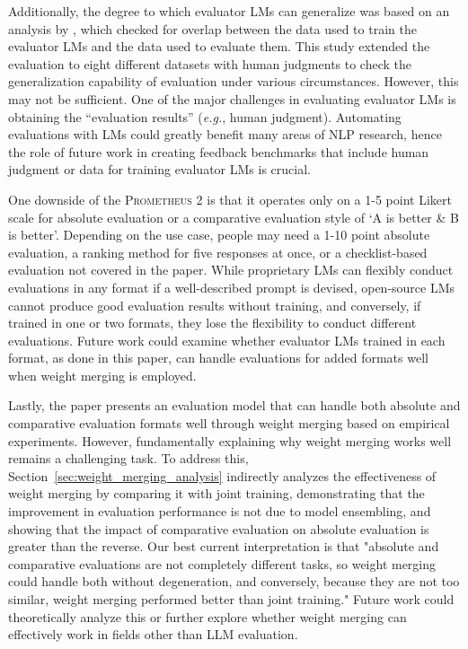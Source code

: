\documentclass[11pt]{article}
\begin{document}
Additionally, the degree to which evaluator LMs can generalize was based on an analysis by \citet{kim2023prometheus}, which checked for overlap between the data used to train the evaluator LMs and the data used to evaluate them. This study extended the evaluation to eight different datasets with human judgments to check the generalization capability of evaluation under various circumstances. However, this may not be sufficient. One of the major challenges in evaluating evaluator LMs is obtaining the ``evaluation results'' (\textit{e.g.}, human judgment). Automating evaluations with LMs could greatly benefit many areas of NLP research, hence the role of future work in creating feedback benchmarks that include human judgment or data for training evaluator LMs is crucial.

One downside of the \textsc{Prometheus 2} is that it operates only on a 1-5 point Likert scale for absolute evaluation or a comparative evaluation style of `A is better \& B is better'. Depending on the use case, people may need a 1-10 point absolute evaluation, a ranking method for five responses at once, or a checklist-based evaluation not covered in the paper. While proprietary LMs can flexibly conduct evaluations in any format if a well-described prompt is devised, open-source LMs cannot produce good evaluation results without training, and conversely, if trained in one or two formats, they lose the flexibility to conduct different evaluations. Future work could examine whether evaluator LMs trained in each format, as done in this paper, can handle evaluations for added formats well when weight merging is employed.

Lastly, the paper presents an evaluation model that can handle both absolute and comparative evaluation formats well through weight merging based on empirical experiments. However, fundamentally explaining why weight merging works well remains a challenging task. To address this, Section~\ref{sec:weight_merging_analysis} indirectly analyzes the effectiveness of weight merging by comparing it with joint training, demonstrating that the improvement in evaluation performance is not due to model ensembling, and showing that the impact of comparative evaluation on absolute evaluation is greater than the reverse. Our best current interpretation is that "absolute and comparative evaluations are not completely different tasks, so weight merging could handle both without degeneration, and conversely, because they are not too similar, weight merging performed better than joint training." Future work could theoretically analyze this or further explore whether weight merging can effectively work in fields other than LLM evaluation.
\end{document}
